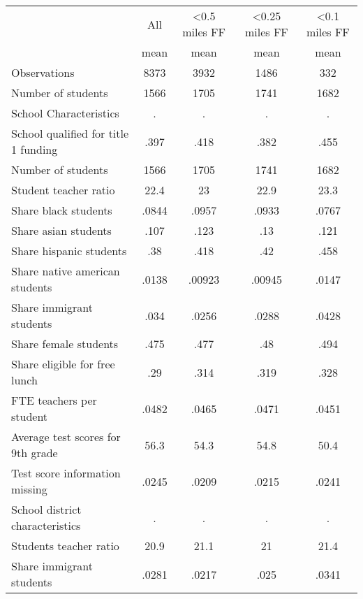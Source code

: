 {
\def\sym#1{\ifmmode^{#1}\else\(^{#1}\)\fi}
\begin{tabular}{l*{4}{c}}
\hline\hline
                    &\multicolumn{1}{c}{All}&\multicolumn{1}{c}{<0.5 miles FF}&\multicolumn{1}{c}{<0.25 miles FF}&\multicolumn{1}{c}{<0.1 miles FF}\\
                    &        mean&        mean&        mean&        mean\\
\hline
Observations        &        8373&        3932&        1486&         332\\
Number of students  &        1566&        1705&        1741&        1682\\
School Characteristics&           .&           .&           .&           .\\
School qualified for title 1 funding&        .397&        .418&        .382&        .455\\
Number of students  &        1566&        1705&        1741&        1682\\
Student teacher ratio&        22.4&          23&        22.9&        23.3\\
Share black students&       .0844&       .0957&       .0933&       .0767\\
Share asian students&        .107&        .123&         .13&        .121\\
Share hispanic students&         .38&        .418&         .42&        .458\\
Share native american students&       .0138&      .00923&      .00945&       .0147\\
Share immigrant students&        .034&       .0256&       .0288&       .0428\\
Share female students&        .475&        .477&         .48&        .494\\
Share eligible for free lunch&         .29&        .314&        .319&        .328\\
FTE teachers per student&       .0482&       .0465&       .0471&       .0451\\
Average test scores for 9th grade&        56.3&        54.3&        54.8&        50.4\\
Test score information missing&       .0245&       .0209&       .0215&       .0241\\
School district characteristics&           .&           .&           .&           .\\
Students teacher ratio&        20.9&        21.1&          21&        21.4\\
Share immigrant students&       .0281&       .0217&        .025&       .0341\\

\end{tabular}}
